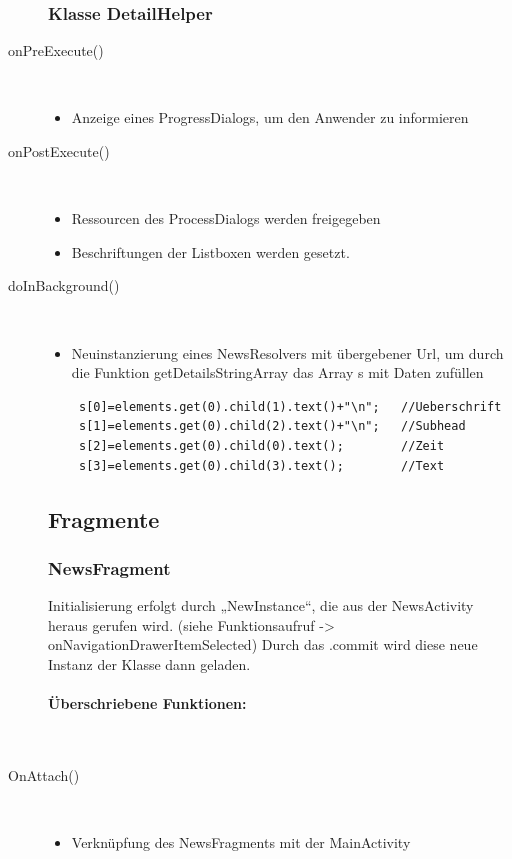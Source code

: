 \begin{description}
\subsubsection{Klasse DetailHelper}
\item[onPreExecute()]~\par
\begin{itemize}
\item Anzeige eines ProgressDialogs, um den Anwender zu informieren
\end{itemize}

\item[onPostExecute()]~\par
\begin{itemize}
\item Ressourcen des ProcessDialogs werden freigegeben
\item Beschriftungen der Listboxen werden gesetzt.
\end{itemize}

\item[doInBackground()]~\par
\begin{itemize}
\item Neuinstanzierung eines NewsResolvers mit übergebener Url, um durch die Funktion getDetailsStringArray das Array s mit Daten zufüllen
\begin{lstlisting}
 s[0]=elements.get(0).child(1).text()+"\n";   //Ueberschrift
 s[1]=elements.get(0).child(2).text()+"\n";   //Subhead
 s[2]=elements.get(0).child(0).text();        //Zeit
 s[3]=elements.get(0).child(3).text();        //Text
\end{lstlisting}
\end{itemize}
\newpage
\subsection{Fragmente}
\subsubsection{NewsFragment}
Initialisierung erfolgt durch „NewInstance“, die aus der NewsActivity heraus gerufen wird. (siehe Funktionsaufruf -> onNavigationDrawerItemSelected)
Durch das .commit wird diese neue Instanz der Klasse dann geladen.
\paragraph{Überschriebene Funktionen:}
\ \\[1em]
\item[OnAttach()]~\par
\begin{itemize}
\item Verknüpfung des NewsFragments mit der MainActivity
\end{itemize}


\end{description}
